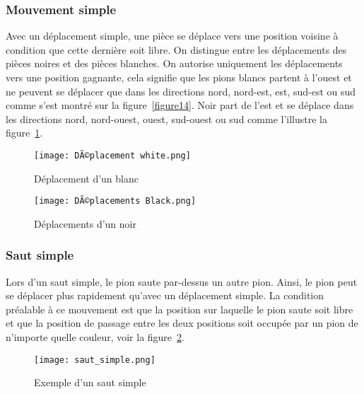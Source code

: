 \documentclass[11pt]{article}
\begin{document}
            \subsubsection{Mouvement simple}
                Avec un déplacement simple, une pièce se déplace vers une position voisine à condition que cette dernière soit libre. On distingue entre les déplacements des pièces noires et des pièces blanches. On autorise uniquement les déplacements vers une position gagnante, cela signifie que les pions blancs partent à l'ouest et ne peuvent se déplacer que dans les directions nord, nord-est, est, sud-est ou sud comme s'est montré sur la figure~\ref{figure14}. Noir part de l'est et se déplace dans les directions nord, nord-ouest, ouest, sud-ouest ou sud comme l'illustre la  figure~\ref{figure15}. 
                \begin{figure}[h]
                \begin{minipage}[c]{.46\linewidth}
                    \centering
                    \texttt{[image: DÃ©placement white.png]}
                    \caption{Déplacement d'un blanc}
                    \label{figure14}
                \end{minipage}
                \hfill%
                \begin{minipage}[c]{.46\linewidth}
                    \centering
                    \texttt{[image: DÃ©placements Black.png]}
                    \caption{Déplacements d'un noir}
                    \label{figure15}
                \end{minipage}
            \end{figure}
            \newpage
            \subsubsection{Saut simple}
                Lors d'un saut simple, le pion saute par-dessus un autre pion. Ainsi, le pion peut se déplacer plus rapidement qu'avec un déplacement simple. La condition préalable à ce mouvement est que la position sur laquelle le pion saute soit libre et que la position de passage entre les deux positions soit occupée par un pion de n'importe quelle couleur, voir la figure~\ref{figure16}.
                \begin{figure}[h]
                            \centering
                            \texttt{[image: saut\_simple.png]}
                            \caption{ Exemple d'un saut simple}
                            \label{figure16}
                            \end{figure}
\end{document}
